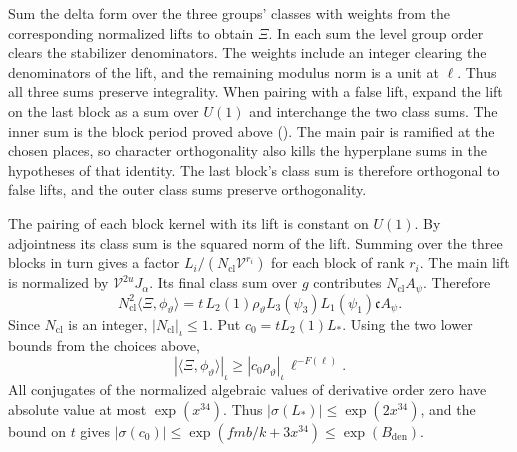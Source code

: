 Sum the delta form over the three groups' classes with weights from
the corresponding normalized lifts to obtain \(\Xi\).
In each sum the level group order clears the stabilizer denominators.
The weights include an integer clearing the denominators of the lift,
and the remaining modulus norm is a unit at \(\ell\).
Thus all three sums preserve integrality.
When pairing with a false lift, expand the lift on the last block as
a sum over \(U(1)\) and interchange the two class sums.
The inner sum is the block period proved above ().
The main pair is ramified at the chosen places, so character orthogonality
also kills the hyperplane sums in the hypotheses of that identity.
The last block's class sum is therefore orthogonal to false lifts,
and the outer class sums preserve orthogonality.

The pairing of each block kernel with its lift is constant on \(U(1)\).
By adjointness its class sum is the squared norm of the lift.
Summing over the three blocks in turn gives a factor \(L_i/(N_\mathrm{cl}\mathcal V^{r_i})\) for each block of rank \(r_i\). The main lift is normalized by
\(\mathcal V^{2u}J_\alpha\). Its final class sum over \(g\) contributes
\(N_\mathrm{cl} A_\psi\). Therefore
\begin{equation}\label{eq:attain-test-form-identity}
 N_\mathrm{cl}^2\langle\Xi,\phi_\vartheta\rangle
   =t\, L_2(1)\rho_\vartheta L_3(\psi_3)L_1(\psi_1)\mathfrak c A_\psi .
\end{equation}
Since \(N_\mathrm{cl}\) is an integer, \(|N_\mathrm{cl}|_\iota\le1\).
Put \(c_0=t L_2(1)L_\ast\). Using the two lower bounds from the choices above,
\begin{equation}
 |\langle\Xi,\phi_\vartheta\rangle|_\iota
    \ge |c_0\rho_\vartheta|_\iota\,\ell^{-F(\ell)} .
 \label{eq:test-pairing-lower}
\end{equation}
All conjugates of the normalized algebraic values of derivative order zero
have absolute value at most \(\exp(x^{34})\).
Thus \(|\sigma(L_\ast)|\le\exp(2x^{34})\), and the bound on \(t\) gives
\(|\sigma(c_0)|\le\exp(fmb/k+3x^{34})\le\exp(B_{\mathrm{den}})\).

